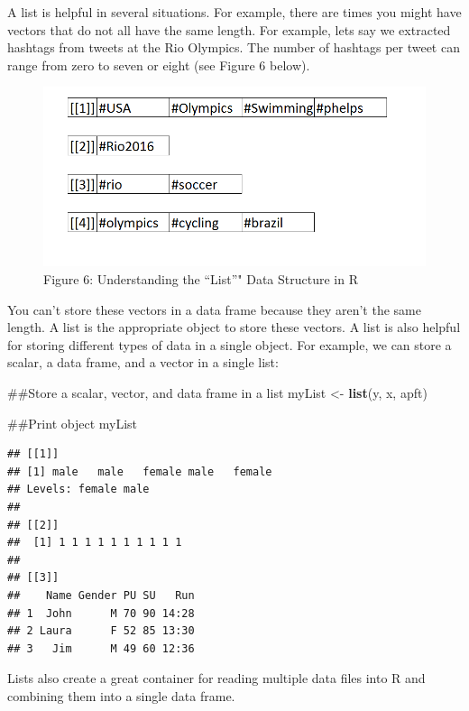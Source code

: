 \documentclass[]{book}
\newenvironment{Shaded}{\begin{snugshade}}{\end{snugshade}}
\newcommand{\KeywordTok}[1]{\textcolor[rgb]{0.13,0.29,0.53}{\textbf{{#1}}}}
\newcommand{\StringTok}[1]{\textcolor[rgb]{0.31,0.60,0.02}{{#1}}}
\newcommand{\NormalTok}[1]{{#1}}
\begin{document}
A list is helpful in several situations. For example, there are times
you might have vectors that do not all have the same length. For
example, lets say we extracted hashtags from tweets at the Rio Olympics.
The number of hashtags per tweet can range from zero to seven or eight
(see Figure 6 below).

\begin{figure}[htbp]
\centering
\includegraphics{list.PNG}
\caption{Figure 6: Understanding the ``List''" Data Structure in R}
\end{figure}

You can't store these vectors in a data frame because they aren't the
same length. A list is the appropriate object to store these vectors. A
list is also helpful for storing different types of data in a single
object. For example, we can store a scalar, a data frame, and a vector
in a single list:

\begin{Shaded}
\begin{Highlighting}[]
\NormalTok{##Store a scalar, vector, and data frame in a list}
\NormalTok{myList <-}\StringTok{ }\KeywordTok{list}\NormalTok{(y, x, apft)}

\NormalTok{##Print object}
\NormalTok{myList}
\end{Highlighting}
\end{Shaded}

\begin{verbatim}
## [[1]]
## [1] male   male   female male   female
## Levels: female male
## 
## [[2]]
##  [1] 1 1 1 1 1 1 1 1 1 1
## 
## [[3]]
##    Name Gender PU SU   Run
## 1  John      M 70 90 14:28
## 2 Laura      F 52 85 13:30
## 3   Jim      M 49 60 12:36
\end{verbatim}

Lists also create a great container for reading multiple data files into
R and combining them into a single data frame.
\end{document}
